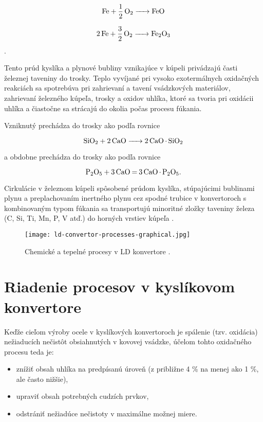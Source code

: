 \begin{equation}
\ce{Fe + 1/2O2 -> FeO}
\end{equation}

\begin{equation}
\ce{2Fe + 3/2O2 -> Fe2O3}
\end{equation}.

Tento prúd kyslíka a plynové bubliny vznikajúce v kúpeli privádzajú časti železnej taveniny do trosky. Teplo vyvíjané pri vysoko exotermálnych oxidačných reakciách sa spotrebúva pri zahrievaní a tavení vsádzkových materiálov, zahrievaní železného kúpeľa, trosky a oxidov uhlíka, ktoré sa tvoria pri oxidácii uhlíka a čiastočne sa strácajú do okolia počas procesu fúkania. 

Vzniknutý  prechádza do trosky ako  podľa rovnice

\begin{equation}
\ce{SiO2 + 2CaO -> 2CaO.SiO2}
\end{equation}

a obdobne  prechádza do trosky ako  podľa rovnice \cite{sprava2017}

\begin{equation}
\ce{P2O5 + 3CaO = 3CaO.P2O5}.
\end{equation}

Cirkulácie v železnom kúpeli spôsobené prúdom kyslíka, stúpajúcimi bublinami plynu a preplachovaním inertného plynu cez spodné trubice v konvertoroch s kombinovaným typom fúkania sa transportujú minoritné zložky taveniny železa (C, Si, Ti, Mn, P, V atď.) do horných vrstiev kúpeľa \cite{Jalkanen2006}. 

\begin{figure}[h!]
	\centering
	\texttt{[image: ld-convertor-processes-graphical.jpg]}
	\caption{Chemické a tepelné procesy v LD konvertore \citep{Jalkanen2006}.}
	\label{o:25}
\end{figure}

\section{Riadenie procesov v kyslíkovom konvertore}

Keďže cieľom výroby ocele v kyslíkových konvertoroch je spálenie (tzv. oxidácia) nežiaducích nečistôt obsiahnutých v kovovej vsádzke, účelom tohto oxidačného procesu teda je:

\begin{itemize}
	\item znížiť obsah uhlíka na predpísanú úroveň (z približne 4 \% na menej ako 1 \%, ale často nižšie),
	\item upraviť obsah potrebných cudzích prvkov,
	\item odstrániť nežiadúce nečistoty v maximálne možnej miere.
\end{itemize}

